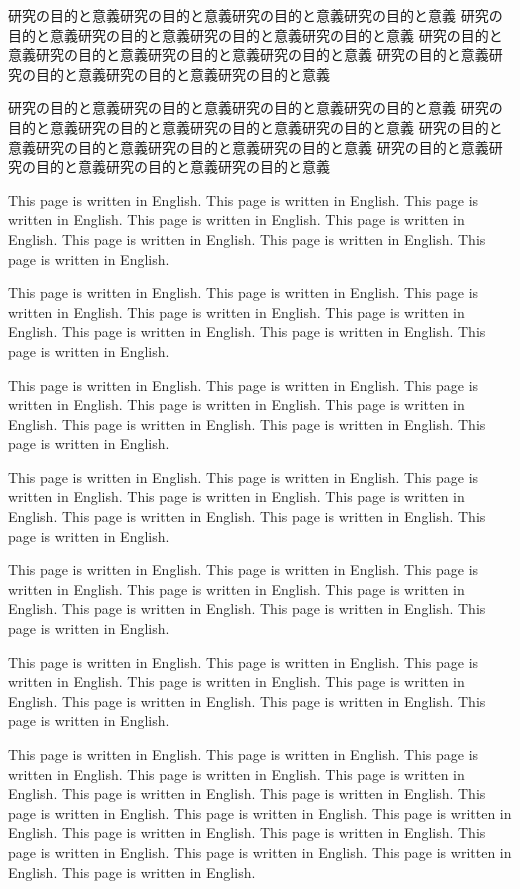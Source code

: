 \documentclass[12pt]{jarticle} %
\begin{document}
研究の目的と意義研究の目的と意義研究の目的と意義研究の目的と意義 
研究の目的と意義研究の目的と意義研究の目的と意義研究の目的と意義 
研究の目的と意義研究の目的と意義研究の目的と意義研究の目的と意義 
研究の目的と意義研究の目的と意義研究の目的と意義研究の目的と意義 

研究の目的と意義研究の目的と意義研究の目的と意義研究の目的と意義 
研究の目的と意義研究の目的と意義研究の目的と意義研究の目的と意義 
研究の目的と意義研究の目的と意義研究の目的と意義研究の目的と意義 
研究の目的と意義研究の目的と意義研究の目的と意義研究の目的と意義 


\newpage

This page is written in English. This page is written in English. 
This page is written in English. This page is written in English. 
This page is written in English. This page is written in English. 
This page is written in English. This page is written in English. 

This page is written in English. This page is written in English. 
This page is written in English. This page is written in English. 
This page is written in English. This page is written in English. 
This page is written in English. This page is written in English. 

This page is written in English. This page is written in English. 
This page is written in English. This page is written in English. 
This page is written in English. This page is written in English. 
This page is written in English. This page is written in English. 

This page is written in English. This page is written in English. 
This page is written in English. This page is written in English. 
This page is written in English. This page is written in English. 
This page is written in English. This page is written in English. 

This page is written in English. This page is written in English. 
This page is written in English. This page is written in English. 
This page is written in English. This page is written in English. 
This page is written in English. This page is written in English. 

This page is written in English. This page is written in English. 
This page is written in English. This page is written in English. 
This page is written in English. This page is written in English. 
This page is written in English. This page is written in English. 

This page is written in English. This page is written in English. 
This page is written in English. This page is written in English. 
This page is written in English. This page is written in English. 
This page is written in English. This page is written in English. 
This page is written in English. This page is written in English. 
This page is written in English. This page is written in English. 
This page is written in English. This page is written in English. 
This page is written in English. This page is written in English. 
\end{document}
